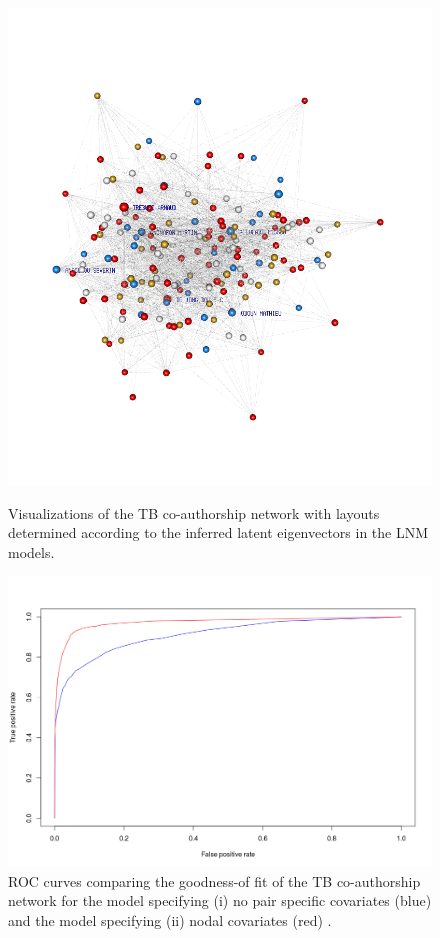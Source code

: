 \begin{figure}[!h]
\vspace{2px}\\
\includegraphics[scale=0.2,trim={5cm 5cm 5cm 5cm}]{Chapters/tb/statMod/lnm_mod7_All.png}
\caption{Visualizations of the TB co-authorship network with layouts determined according to the inferred latent eigenvectors in the LNM models.
}
\label{fig:tb_lnm_viz}
\end{figure}

\begin{figure}[!h]
\centering
\includegraphics[scale=0.5]{Chapters/tb/statMod/tb_lnm_ROC.png}
\caption{ROC curves comparing the goodness-of fit of the TB co-authorship network for the model specifying (i) no pair specific covariates (blue) and the model specifying (ii) nodal covariates (red)%
.}
\label{fig:tb_lnm_roc}
\end{figure}

